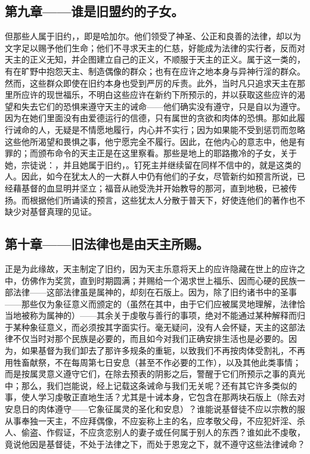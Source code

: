 
\subsection{第九章——谁是旧盟约的子女。}

但那些人属于旧约，，即是哈加尔。他们领受了神圣、公正和良善的法律，却以为文字足以赐予他们生命；他们不寻求天主的仁慈，好能成为法律的实行者，反而对天主的正义无知，并企图建立自己的正义，不顺服于天主的正义。属于这一类的，有在旷野中抱怨天主、制造偶像的群众；也有在应许之地本身与异神行淫的群众。然而，这些群众即使在旧约本身也受到严厉的斥责。此外，当时凡只追求天主在那里所应许的现世福乐，不明白这些应许在新约下所预示的，并以获取这些应许的渴望和失去它们的恐惧来遵守天主的诫命——他们确实没有遵守，只是自以为遵守。因为在她们里面没有由爱德运行的信德，只有属世的贪欲和肉体的恐惧。那如此履行诫命的人，无疑是不情愿地履行，内心并不实行；因为如果能不受到惩罚而忽略这些他所渴望和畏惧之事，他宁愿完全不履行。因此，在他内心的意志中，他是有罪的；而颁布命令的天主正是在这里察看。那些是地上的耶路撒冷的子女，关于她，宗徒说：，并且她属于旧约，。钉死主并继续留在同样不信中的，就是这类的人。因此，如今在犹太人的一大群人中仍有他们的子女，尽管新约如预言所说，已经藉基督的血显明并坚立；福音从祂受洗并开始教导的那河，直到地极，已被传扬。而根据他们所诵读的预言，这些犹太人分散于普天下，好使连他们的著作也不缺少对基督真理的见证。\par


\subsection{第十章——旧法律也是由天主所赐。}

正是为此缘故，天主制定了旧约，因为天主乐意将天上的应许隐藏在世上的应许之中，仿佛作为奖赏，直到时期圆满；并赐给一个渴求世上福乐、因而心硬的民族一部法律——这部法律虽是属神的，却刻在石版上。因为，除了旧约诸书中的圣事——那些仅为象征意义而颁定的（虽然在其中，由于它们应被属灵地理解，法律恰当地被称为属神的）——其余关于虔敬与善行的事项，绝对不能通过某种解释而归于某种象征意义，而必须按其字面实行。毫无疑问，没有人会怀疑，天主的这部法律不仅当时对那个民族是必要的，而且如今对我们正确安排生活也是必要的。因为，如果基督为我们卸去了那许多规条的重轭，以致我们不再按肉体受割礼，不再用牲畜献祭，不在每周第七日安息（甚至不作必要的工作），以及其他此类事情；而是按属灵意义遵守它们，在除去预表的阴影之后，警醒于它们所预示之事的真光中；那么，我们岂能说，经上记载这条诫命与我们无关呢？还有其它许多类似的事，使人学习虔敬正直地生活？尤其是十诫本身，它包含在那两块石版上（除去对安息日的肉体遵守——它象征属灵的圣化和安息）？谁能说基督徒不应以宗教的服从事奉独一天主，不应拜偶像，不应妄称上主的名，应孝敬父母，不应犯奸淫、杀人、偷盗、作假证，不应贪恋别人的妻子或任何属于别人的东西？谁如此不虔敬，竟说他因是基督徒，不处于法律之下，而处于恩宠之下，就不遵守这些法律诫命？\par

